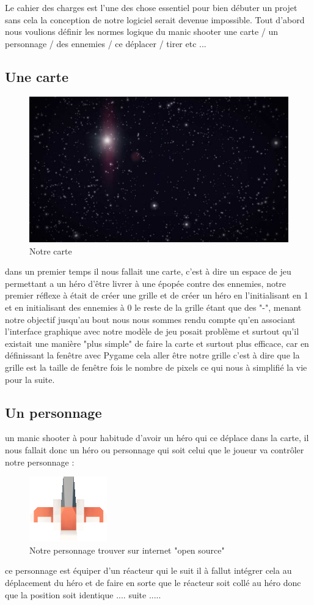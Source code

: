 \documentclass[a4paper, 11pt]{article}
\begin{document}
Le cahier des charges est l'une des chose essentiel pour bien débuter un projet sans cela la conception de notre logiciel serait devenue impossible.
Tout d'abord nous voulions définir les normes logique du manic shooter 
une carte / un personnage / des ennemies / ce déplacer / tirer etc ... 


 	\subsection{Une carte}
 	\begin{figure}[ht!]
\centering
\includegraphics[width=0.8\linewidth]{Background.jpg}
\caption{Notre carte}
\end{figure}
 	dans un premier temps il nous fallait une carte, c'est à dire un espace de jeu permettant a un héro d'être livrer à une épopée contre des ennemies,
 	notre premier réflexe à était de créer une grille et de créer un héro en l'initialisant en 1 et en initialisant des ennemies à 0 le reste de la grille étant que des "-", menant notre objectif jusqu'au bout nous nous sommes rendu compte qu'en associant l'interface graphique avec notre modèle de jeu posait problème et surtout qu'il existait une manière "plus simple" de faire la carte et surtout plus efficace, car en définissant la fenêtre avec Pygame cela aller être notre grille c'est à dire que la grille est la taille de fenêtre fois le nombre de pixels ce qui nous à simplifié la vie pour la suite.

 	
	\subsection{Un personnage}
un manic shooter à pour habitude d'avoir un héro qui ce déplace dans la carte, il nous fallait donc un héro ou personnage qui soit celui que le joueur va contrôler notre personnage :
\begin{figure}[ht!]
\centering
\includegraphics[width=0.1\linewidth]{spaceCraft1.png}
\caption{Notre personnage trouver sur internet "open source"}
\end{figure}
ce personnage est équiper d'un réacteur qui le suit il à fallut intégrer cela au déplacement du héro et de faire en sorte que le réacteur soit collé au héro donc que la position soit identique .... suite .....
\end{document}
